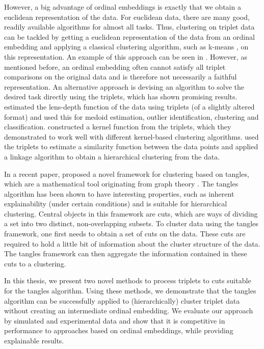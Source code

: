 However, a big advantage of ordinal embeddings is exactly that we obtain a euclidean representation of the data. 
For euclidean data, there are many good, readily available algorithms for almost all tasks. 
Thus, clustering on triplet data can be tackled by getting a euclidean representation of the data
from an ordinal embedding and applying a classical clustering algorithm, such as k-means \citep{lloydLeastSquaresQuantization1982}, on 
this representation. An example of this approach can be seen in \citep{kleindessnerLensDepthFunction2017}. However, as mentioned before, an ordinal embedding 
often cannot satisfy all triplet comparisons on the original data and is therefore not 
necessarily a faithful representation. 
An alternative approach is devising an algorithm to solve the desired task directly 
using the triplets, which has shown promising results.
\cite{kleindessnerLensDepthFunction2017} estimated the lens-depth function
of the data using triplets (of a slightly altered format) and used this for 
medoid estimation, outlier identification, clustering and classification. 
\cite{kleindessnerKernelFunctionsBased2017} constructed a kernel function from
the triplets, which they demonstrated to work well with 
different kernel-based clustering algorithms.
\cite{ghoshdastidarFoundationsComparisonBasedHierarchical2019} used the 
triplets to estimate a similarity function between the data points and applied 
a linkage algorithm to obtain a hierarchical clustering from the data.

In a recent paper, \cite{klepperClusteringTanglesAlgorithmic2021} proposed a novel framework
for clustering based on tangles, which are a mathematical tool originating from graph theory 
\citep{robertsonGraphMinorsObstructions1991}. The tangles algorithm has been shown to have 
interesting properties, such as inherent explainability (under certain conditions) and is suitable for hierarchical clustering.
Central objects in this framework are cuts, which are ways of dividing a set into
two distinct, non-overlapping subsets. To cluster data using the tangles framework, one first
needs to obtain a set of cuts on the data. These cuts are required to
hold a little bit of information about the cluster structure of the data. The 
tangles framework can then aggregate the information contained in these cuts to a
clustering. 

In this thesis, we present two novel methods to process triplets to cuts suitable for the
tangles algorithm. Using these methods, we 
demonstrate that the tangles algorithm can be successfully applied to (hierarchically) cluster triplet data without creating an intermediate ordinal embedding. 
We evaluate our approach by simulated and experimental data and show that it is competitive 
in performance to approaches based on ordinal embeddings, while providing explainable results. 

